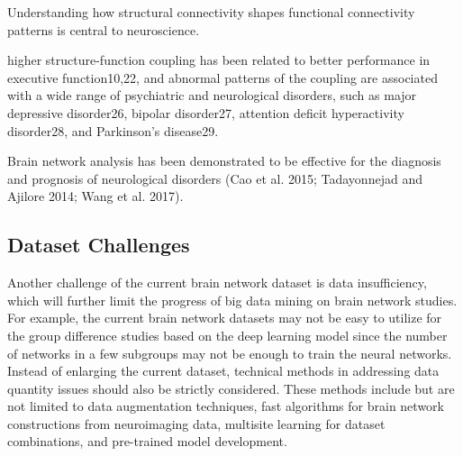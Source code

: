 Understanding how structural connectivity shapes functional connectivity 
patterns is central to neuroscience. 

higher structure-function coupling has been related to better performance 
in executive function10,22, and abnormal patterns of the
coupling are associated with a wide range of psychiatric and 
neurological disorders, such as major depressive disorder26, 
bipolar disorder27, attention deficit hyperactivity disorder28, 
and Parkinson’s disease29.

\cite{Chen2024}


Brain network analysis has been demonstrated to be effective for the 
diagnosis and prognosis of neurological disorders (Cao et al. 2015; Tadayonnejad
and Ajilore 2014; Wang et al. 2017). \cite{Zhang2022}

\subsection{ Dataset Challenges}
Another challenge of the current brain network
dataset is data insufficiency, which will further 
limit the progress of big data mining on brain network studies. 
For example, the current brain network datasets may not be easy 
to utilize for the group difference studies based on the deep 
learning model since the number of networks in a few subgroups 
may not be enough to train the neural networks.
Instead of enlarging the current dataset, technical methods 
in addressing data quantity issues should also be strictly 
considered. These methods include but are not limited to 
data augmentation techniques, fast algorithms for brain 
network constructions from neuroimaging data, multisite 
learning for dataset combinations, and pre-trained model
development. \cite{Tang2023}


